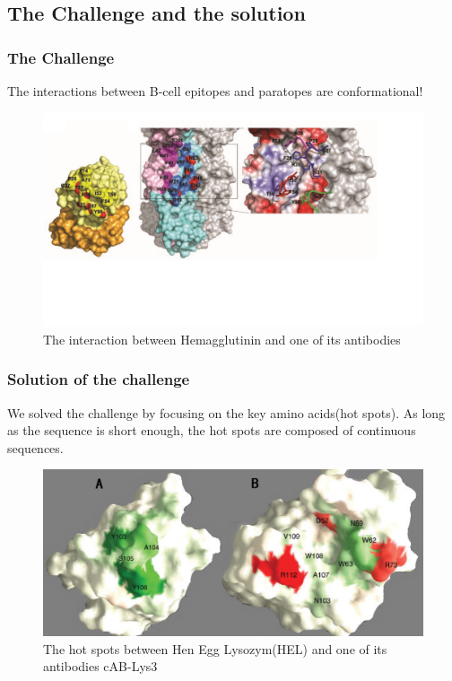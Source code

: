 \documentclass[hyperref={pdfpagelabels=false}]{beamer}
\begin{document}
\subsection{The Challenge and the solution}
\begin{frame}
\frametitle{The Challenge} 
The interactions between B-cell epitopes and paratopes are conformational!

\begin{figure}
	\centering
	\includegraphics[scale=0.25]{ConformationalEpitope2}	
	\vspace{-2cm}
	\caption{\small{The interaction between Hemagglutinin and one of its antibodies}}
\end{figure}
\end{frame}

\begin{frame}
\frametitle{Solution of the challenge} 
We solved the challenge by focusing on the key amino acids(hot spots). As long as the sequence is short enough, the hot spots are composed of continuous sequences.
\vspace{0.3cm}

\begin{figure}[H]
	\centering
	\includegraphics[scale=0.25]{HotSpot}	
	\caption{\small{The hot spots between Hen Egg Lysozym(HEL) and one of its antibodies cAB-Lys3 }}
\end{figure}
\end{frame}
\end{document}
